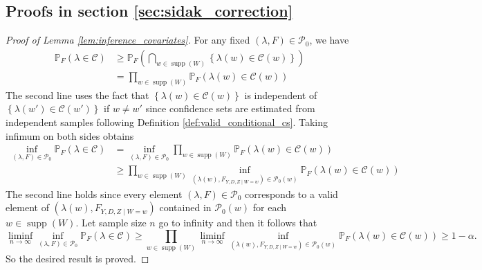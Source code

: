 \documentclass[11pt]{article}
\theoremstyle{definition}
\DeclareMathOperator*{\supp}{supp}
\newcommand{\Prob}{\ensuremath{\mathbb{P}}} %
\newcommand{\0}{\ensuremath{\mathbf{0}}}
\begin{document}
\begin{bibunit}
\subsection{Proofs in section \ref{sec:sidak_correction}}

\begin{proof}[Proof of Lemma \ref{lem:inference_covariates}]
For any fixed $(\lambda,F)\in\mathcal{P}_0$, we have 
	\begin{align*}
	\Prob_F\left(\lambda \in {\mathcal{C}}\right)
	&\geq
	\Prob_F\left(\bigcap_{w\in\supp(W)} \left\{\lambda(w) \in {\mathcal{C}}(w)\right\}\right) \\
	&=
	\prod_{w\in\supp(W)}\Prob_F\left(\lambda(w) \in {\mathcal{C}}(w)\right) 
	\end{align*}
The second line uses the fact that $\left\{\lambda(w) \in {\mathcal{C}}(w)\right\}$ is independent of $\left\{\lambda(w')\in\mathcal{C}(w')\right\}$ if $w\neq w'$ since confidence sets are estimated from independent samples following Definition \ref{def:valid_conditional_cs}. Taking infimum on both sides obtains
\begin{align*}
	\inf_{(\lambda, F)\in\mathcal{P}_0} \Prob_F\left(\lambda \in {\mathcal{C}}\right) 
	&= \inf_{(\lambda, F)\in\mathcal{P}_0} \prod_{w\in\supp(W)} \Prob_F(\lambda(w) \in {\mathcal{C}}(w)) \\
	&\geq \prod_{w\in\supp(W)} \inf_{(\lambda(w), F_{Y,D,Z\mid W=w}) \in \mathcal{P}_0(w)}\Prob_F(\lambda(w) \in {\mathcal{C}}(w))
\end{align*}
The second line holds since every element $(\lambda,F)\in\mathcal{P}_0$ corresponds to a valid element of $(\lambda(w), F_{Y,D,Z\mid W=w})$ contained in $\mathcal{P}_0(w)$ for each $w \in \supp(W)$. Let sample size $n$ go to infinity and then it follows that
\[
		\liminf_{n\to\infty}\inf_{(\lambda, F)\in\mathcal{P}_0} \Prob_F\left(\lambda \in {\mathcal{C}}\right) 
		\geq
		\prod_{w\in\supp(W)} \liminf_{n\to\infty} \inf_{(\lambda(w), F_{Y,D,Z\mid W=w}) \in \mathcal{P}_0(w)}\Prob_F(\lambda(w) \in {\mathcal{C}}(w)) \geq 1-\alpha.
\]
So the desired result is proved.
\end{proof}

\bigskip


\end{bibunit}
\end{document}
